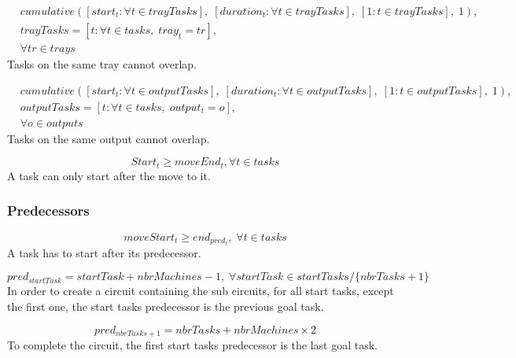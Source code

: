 \documentclass[10pt,a4paper]{report}
\begin{document}
\begin{equation}
\begin{aligned}\label{eq:105}
&cumulative([start_{t} : \forall t \in trayTasks], \; [duration_t : \forall t \in trayTasks], \; [1 : t \in trayTasks], \; 1), \\
&trayTasks = [t : \forall t \in tasks, \; tray_t = tr], \\
&\forall tr \in trays
\end{aligned}
\end{equation}
Tasks on the same tray cannot overlap.

\begin{equation}
\begin{aligned}\label{eq:106}
&cumulative([start_{t} : \forall t \in outputTasks], \; [duration_t : \forall t \in outputTasks], \; [1 : t \in outputTasks], \; 1), \\
&outputTasks = [t : \forall t \in tasks, \; output_t = o], \\
&\forall o \in outputs
\end{aligned}
\end{equation}
Tasks on the same output cannot overlap.

\begin{equation}\label{eq:107}
Start_t \geq moveEnd_t, \forall t \in tasks\end{equation}
A task can only start after the move to it.

\subsubsection*{Predecessors}

\begin{equation}\label{eq:108}
moveStart_t \geq end_{pred_t}, \; \forall t \in tasks\end{equation}
A task has to start after its predecessor.

\begin{equation}\label{eq:109}
pred_{startTask} = startTask + nbrMachines - 1, \; \forall startTask \in startTasks / \{nbrTasks + 1\}\end{equation}
In order to create a circuit containing the sub circuits, for all start tasks, except the first one, the start tasks predecessor is the previous goal task.

\begin{equation}\label{eq:110}
pred_{nbrTasks + 1} = nbrTasks + nbrMachines \times 2\end{equation}
To complete the circuit, the first start tasks predecessor is the last goal task.
\end{document}
